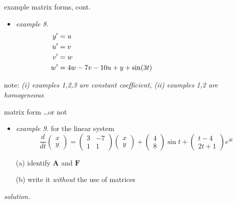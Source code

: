 \documentclass[urlcolor=blue,dvipsnames]{beamer}
\newcommand{\bA}{\mathbf{A}}
\newcommand{\bF}{\mathbf{F}}
\begin{document}
\begin{frame}{example matrix forms, cont.}

\small
\begin{itemize}
\item \emph{example 8.}
\begin{align*}
y' &= u \hspace{75mm} \\
u' &= v \\
v' &= w \\
w' &= 4w-7v-10u+y+\sin(3t)
\end{align*}
\end{itemize}

\vspace{30mm}
\scriptsize note: \emph{(i) examples 1,2,3 are constant coefficient, (ii) examples 1,2 are homogeneous}
\end{frame}


\begin{frame}{matrix form \dots or not}

\begin{itemize}
\item \emph{example 9.}  for the linear system
    $$\frac{d}{dt} \begin{pmatrix} x \\ y \end{pmatrix} =  \begin{pmatrix} 3 & -7 \\ 1 & 1 \end{pmatrix} \begin{pmatrix} x \\ y \end{pmatrix} + \begin{pmatrix} 4 \\ 8 \end{pmatrix} \sin t + \begin{pmatrix} t-4 \\ 2t+1 \end{pmatrix} e^{4t}$$

(a) identify $\bA$ and $\bF$

(b) write it \emph{without} the use of matrices
\end{itemize}

\noindent \emph{solution.}

\vspace{50mm}
\end{frame}
\end{document}
